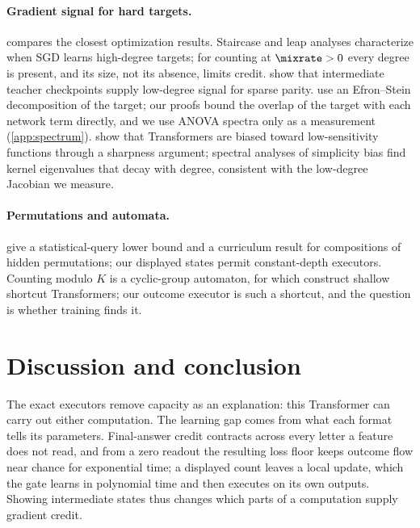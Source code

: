 \paragraph{Gradient signal for hard targets.}  compares the closest optimization results. Staircase and leap analyses
\citep{abbe2021staircase,abbe2022mergedstaircase,abbe2023sgd} characterize when SGD learns high-degree targets; for counting at
$\mixrate>0$ every degree is present, and its size, not its absence, limits credit. \citet{panigrahi2025progressive} show that intermediate
teacher checkpoints supply low-degree signal for sparse parity. \citet{li2025noise} use an Efron--Stein decomposition of the target; our
proofs bound the overlap of the target with each network term directly, and we use ANOVA spectra only as a measurement
(\cref{app:spectrum}). \citet{hahn2024sensitive} show that Transformers are biased toward low-sensitivity functions through a sharpness
argument; spectral analyses of simplicity bias \citep{yang2019spectral} find kernel eigenvalues that decay with degree, consistent with the
low-degree Jacobian we measure.

\paragraph{Permutations and automata.} \citet{wang2025compositional} give a statistical-query lower bound and a curriculum result for
compositions of hidden permutations; our displayed states permit constant-depth executors. Counting modulo $K$ is a cyclic-group
automaton, for which \citet{liu2023automata} construct shallow shortcut Transformers; our outcome executor is such a shortcut, and the
question is whether training finds it.

\section{Discussion and conclusion}
\label{sec:conclusion}
\label{sec:discussion}

The exact executors remove capacity as an explanation: this Transformer can carry out either computation. The learning gap comes from
what each format tells its parameters. Final-answer credit contracts across every letter a feature does not read, and from a zero readout
the resulting loss floor keeps outcome flow near chance for exponential time; a displayed count leaves a local update, which the gate
learns in polynomial time and then executes on its own outputs. Showing intermediate states thus changes which parts of a computation
supply gradient credit.

